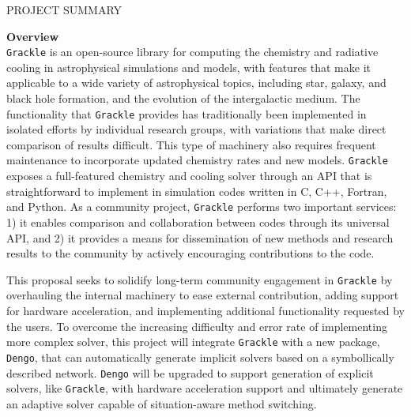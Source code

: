 \documentclass[11pt]{article}
\newcommand{\grackle}{\texttt{Grackle}}
\newcommand{\dengo}{\texttt{Dengo}}
\begin{document}
\thispagestyle{empty}

\clearpage

\clearpage
\begin{center} 
{\large PROJECT SUMMARY}\\
\end{center}

\begin{flushleft}
\noindent
{\bf \large Overview}\\
\grackle{} is an open-source library for computing the chemistry and
radiative cooling in astrophysical simulations and models, with
features that make it applicable to a wide variety of astrophysical
topics, including star, galaxy, and black hole formation, and the
evolution of the intergalactic medium.
The functionality that \grackle{} provides has traditionally
been implemented in isolated efforts by individual research groups,
with variations that make direct comparison of results difficult.
This type of machinery also requires frequent maintenance to
incorporate updated chemistry rates and new models.
\grackle{} exposes a full-featured chemistry and cooling solver
through an API that is straightforward to implement in simulation
codes written in C, C++, Fortran, and Python.
As a community project, \grackle{} performs two important services: 1)
it enables comparison and collaboration between codes through its universal API,
and 2) it provides a means for dissemination of new methods and
research results to the community by actively encouraging
contributions to the code.

This proposal seeks to solidify long-term community engagement in
\grackle{} by overhauling the internal machinery to ease external
contribution, adding support for hardware acceleration, and
implementing additional functionality requested by the users. To
overcome the increasing difficulty and error rate of implementing more
complex solver, this project will integrate \grackle{} with a new package,
\dengo{}, that can automatically generate implicit solvers based on a
symbollically described network. \dengo{} will be upgraded to support
generation of explicit solvers, like \grackle{}, with hardware
acceleration support and ultimately generate an adaptive solver
capable of situation-aware method switching.


\end{flushleft}
\end{document}
